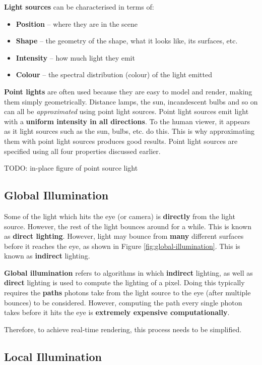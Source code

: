 \documentclass{article}
\begin{document}
\textbf{Light sources} can be characterised in terms of:
\begin{itemize}
	\item \textbf{Position} -- where they are in the scene
	\item \textbf{Shape} -- the geometry of the shape, what it looks like, its surfaces, etc.
	\item \textbf{Intensity} -- how much light they emit
	\item \textbf{Colour} -- the spectral distribution (colour) of the light emitted
\end{itemize}

\textbf{Point lights} are often used because they are easy to model and render, making them simply geometrically. Distance lamps, the sun, incandescent bulbs and so on can all be \textit{approximated} using point light sources. Point light sources emit light with a \textbf{uniform intensity in all directions}. To the human viewer, it appears as it light sources such as the sun, bulbs, etc. do this. This is why approximating them with point light sources produces good results. Point light sources are specified using all four properties discussed earlier.

TODO: in-place figure of point source light

\subsection{Global Illumination}

Some of the light which hits the eye (or camera) is \textbf{directly} from the light source. However, the rest of the light bounces around for a while. This is known as \textbf{direct lighting}. However, light may bounce from \textbf{many} different surfaces before it reaches the eye, as shown in Figure \ref{fig:global-illumination}. This is known as \textbf{indirect} lighting.

\textbf{Global illumination} refers to algorithms in which \textbf{indirect} lighting, as well as \textbf{direct} lighting is used to compute the lighting of a pixel. Doing this typically requires the \textbf{paths} photons take from the light source to the eye (after multiple bounces) to be considered. However, computing the path every single photon takes before it hits the eye is \textbf{extremely expensive computationally}.

Therefore, to achieve real-time rendering, this process needs to be simplified.

\subsection{Local Illumination}
\end{document}
